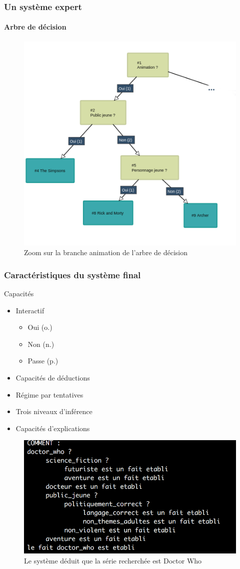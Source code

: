 \documentclass[11pt]{beamer}
\begin{document}
\begin{frame}
\frametitle{Un système expert}
\framesubtitle{Arbre de décision}
\begin{figure}
\includegraphics[scale=0.3]{arbre_zoom.png}
\caption{Zoom sur la branche animation de l'arbre de décision}
\end{figure}
\end{frame}

\begin{frame}
\frametitle{Caractéristiques du système final}
\begin{block}{Capacités}
\begin{itemize}
\item Interactif
\begin{itemize}
\item Oui (o.)
\item Non (n.)
\item Passe (p.)
\end{itemize}
\item Capacités de déductions
\item Régime par tentatives
\item Trois niveaux d'inférence
\item Capacités d'explications
\end{itemize}
\end{block}
\end{frame}

\begin{frame}
\begin{figure}
\includegraphics[scale=0.4]{exemple.png}
\caption{Le système déduit que la série recherchée est Doctor Who}
\end{figure}

\end{frame}
\end{document}
